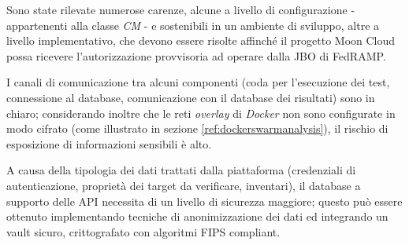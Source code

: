 \documentclass[../main.tex]{subfiles}
\begin{document}
Sono state rilevate numerose carenze, alcune a livello di configurazione - appartenenti alla classe \textit{CM} - e sostenibili in un ambiente di sviluppo, altre a livello implementativo, che devono essere risolte affinché il progetto Moon Cloud possa ricevere l'autorizzazione provvisoria ad operare dalla JBO di FedRAMP.

I canali di comunicazione tra alcuni componenti (coda per l'esecuzione dei test, connessione al database, comunicazione con il database dei risultati) sono in chiaro; considerando inoltre che le reti \textit{overlay} di \textit{Docker} non sono configurate in modo cifrato (come illustrato in sezione \ref{ref:dockerswarmanalysis}), il rischio di esposizione di informazioni sensibili è alto.

A causa della tipologia dei dati trattati dalla piattaforma (credenziali di autenticazione, proprietà dei target da verificare, inventari), il database a supporto delle API necessita di un livello di sicurezza maggiore; questo può essere ottenuto implementando tecniche di anonimizzazione dei dati ed integrando un vault sicuro, crittografato con algoritmi FIPS compliant.
\end{document}
